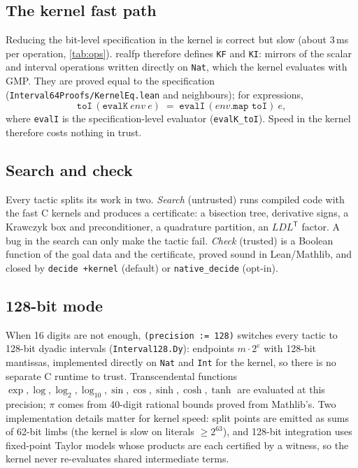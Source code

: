 \documentclass[11pt]{article}
\theoremstyle{definition}
\theoremstyle{remark}
\newcommand{\lean}[1]{\texttt{#1}}
\newcommand{\realfp}{\textsf{realfp}}
\begin{document}
\subsection{The kernel fast path}\label{sec:kernel}

Reducing the bit-level specification in the kernel is correct but slow
(about 3\,ms per operation, \cref{tab:ops}). \realfp{} therefore defines
\lean{KF} and \lean{KI}: mirrors of the scalar and interval operations
written directly on \lean{Nat}, which the kernel evaluates with GMP. They
are proved equal to the specification
(\lean{Interval64Proofs/KernelEq.lean} and neighbours); for expressions,
\[
  \lean{toI}\,(\lean{evalK}\ \mathit{env}\ e) \;=\; \lean{evalI}\,(\mathit{env}.\lean{map toI})\ e ,
\]
where \lean{evalI} is the specification-level evaluator
(\lean{evalK\_toI}). Speed in the kernel therefore costs nothing in trust.

\subsection{Search and check}

Every tactic splits its work in two.
\emph{Search} (untrusted) runs compiled code with the fast C kernels and
produces a certificate: a bisection tree, derivative signs, a Krawczyk box
and preconditioner, a quadrature partition, an $LDL^{\mathsf T}$ factor.
A bug in the search can only make the tactic fail.
\emph{Check} (trusted) is a Boolean function of the goal data and the
certificate, proved sound in Lean/Mathlib, and closed by
\lean{decide +kernel} (default) or \lean{native\_decide} (opt-in).

\subsection{128-bit mode}

When 16 digits are not enough, \lean{(precision := 128)} switches every
tactic to 128-bit dyadic intervals (\lean{Interval128.Dy}): endpoints
$m\cdot 2^{e}$ with 128-bit mantissas, implemented directly on \lean{Nat}
and \lean{Int} for the kernel, so there is no separate C runtime to trust.
Transcendental functions $\exp,\log,\log_2,\log_{10},\sin,\cos,\sinh,\cosh,
\tanh$ are evaluated at this precision; $\pi$ comes from 40-digit rational
bounds proved from Mathlib's. Two implementation details matter for kernel
speed: split points are emitted as sums of 62-bit limbs (the kernel is slow
on literals $\ge 2^{63}$), and 128-bit integration uses fixed-point Taylor
models whose products are each certified by a witness, so the kernel never
re-evaluates shared intermediate terms.
\end{document}

